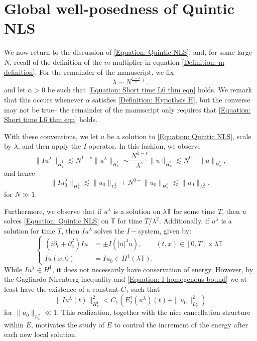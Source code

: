 \documentclass[12pt, letterpaper]{amsart}
\begin{document}
\section{Global well-posedness of Quintic NLS}\label{Section: Proof of prop 1}
We now return to the discussion of \eqref{Equation: Quintic NLS}, and, for some large $N$, recall of the definition of the $m$ multiplier in equation \eqref{Definition: m definition}. For the remainder of the manuscript, we fix
\[
\lambda \sim N^{\frac{1-s}{s}+}.
\]
and let $\alpha > 0$ be such that \eqref{Equation: Short time L6 thm eqn} holds. We remark that this occurs whenever $\alpha$ satisfies \ref{Definition: Hypothsis H}, but the converse may not be true-- the remainder of the manuscript only requires that \eqref{Equation: Short time L6 thm eqn} holds.

With these conventions, we let $u$ be a solution to \eqref{Equation: Quintic NLS}, scale by $\lambda$, and then apply the $I$ operator. In this fashion, we observe
\[
\|Iu^\lambda\|_{\dot{H}^1_x}\lesssim N^{1-s}\|u^\lambda\|_{\dot{H}^s_x}\sim \frac{N^{1-s}}{\lambda^s}\|u\|_{\dot{H}^s_x}\lesssim N^{0-}\|u\|_{\dot{H}^s_x},
\]
and hence 
\begin{equation}\label{Equation: I homogenous bound}
\|Iu_0^\lambda\|_{H^1_x}\lesssim \|u_0\|_{L^2_x} + N^{0-}\|u_0\|_{\dot{H}^s_x}\lesssim \|u_0\|_{L^2_x},
\end{equation}
for $N\gg 1$.

Furthermore, we observe that if $u^\lambda$ is a solution on $\lambda\mathbb{T}$ for some time $T$, then $u$ solves \eqref{Equation: Quintic NLS} on $\mathbb{T}$ for time $T/\lambda^2$. Additionally, if $u^\lambda$ is a solution for time $T$, then $Iu^\lambda$ solves the $I-$system, given by:
\begin{equation}\label{Equation: NLS with I operator}
    \begin{cases}
    (i\partial_t+\partial_{x}^2)Iu &= \pm I(|u|^4u),\qquad(t,x)\in[0, T]\times\lambda\mathbb{T}\\
    Iu(x,0) &= Iu_0\in H^1(\lambda\mathbb{T}).
    \end{cases}
\end{equation}
While $Iu^\lambda\in H^1$, it does not necessarily have conservation of energy. However, by the Gagliardo-Nirenberg inequality and \eqref{Equation: I homogenous bound} we at least have the existence of a constant $C_1$ such that
\begin{equation}\label{Equation: I method base bound}
\|Iu^\lambda(t)\|_{H^1_x}^2< C_1(E^1_I(u^\lambda)(t) + \|u_0\|_{L^2_x}^2)
\end{equation}
for $\|u_0\|_{L^2_x}\ll 1$. This realization, together with the nice cancellation structure within $E$, motivates the study of $E$ to control the increment of the energy after each new local solution. 
\end{document}
